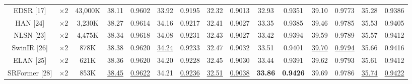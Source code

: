 \documentclass[twocolumn]{svjour3}          %
\begin{document}
\begin{table}
\begin{tabular}{|c|c|c|cc|cc|cc|cc|cc|cc|}

EDSR [17] & $\times 2$&43,000K& \multicolumn{1}{c|}{38.11} & 0.9602 & \multicolumn{1}{c|}{33.92} & 0.9195  &\multicolumn{1}{c|}{32.32} & 0.9013 & \multicolumn{1}{c|}{32.93} & 0.9351  & \multicolumn{1}{c|}{39.10} & 0.9773
&\multicolumn{1}{c|}{35.28} &0.9386\\

HAN [24] & $\times 2$&3,230K& \multicolumn{1}{c|}{38.27} & 0.9614  & \multicolumn{1}{c|}{34.16} & 0.9217  &\multicolumn{1}{c|}{32.41} & 0.9027 & \multicolumn{1}{c|}{33.35} &0.9385& \multicolumn{1}{c|}{39.46} & 0.9785
&\multicolumn{1}{c|}{35.53} &0.9405\\

NLSN [23] & $\times 2$ &4,475K& \multicolumn{1}{c|}{38.34} & 0.9618 & \multicolumn{1}{c|}{34.08} & 0.9231 & \multicolumn{1}{c|}{32.43} & 0.9027 & \multicolumn{1}{c|}{33.42} &0.9394 & \multicolumn{1}{c|}{39.59} & 0.9789
&\multicolumn{1}{c|}{35.57} & 0.9412\\


SwinIR [26] & $\times 2$ &878K& \multicolumn{1}{c|}{38.38} & {0.9620} & \multicolumn{1}{c|}{\color{blue}\underline{34.24}} &{ 0.9233} & \multicolumn{1}{c|}{32.47} & {0.9032} & \multicolumn{1}{c|}{33.51} & {0.9401} & \multicolumn{1}{c|}{\color{blue}\underline{39.70}} &{\color{blue}\underline{0.9794}} &\multicolumn{1}{c|}{35.66} & { 0.9416}\\

ELAN [25] & $\times 2$ &621K& \multicolumn{1}{c|}{38.36} & 0.9620 & \multicolumn{1}{c|}{34.20} & 0.9228 & \multicolumn{1}{c|}{32.45} & 0.9030 & \multicolumn{1}{c|}{33.44} &0.9391 & \multicolumn{1}{c|}{39.62} & 0.9793
&\multicolumn{1}{c|}{35.61} & 0.9412\\

SRFormer [28] & $\times 2$ &853K& \multicolumn{1}{c|}{\color{blue}\underline{38.45}} & {\color{blue}\underline{0.9622}} & \multicolumn{1}{c|}{34.21} &{\color{blue}\underline{ 0.9236}} & \multicolumn{1}{c|}{\color{blue}\underline{32.51}} & {\color{blue}\underline{0.9038}} & \multicolumn{1}{c|}{\color{red}\textbf{33.86}} & {\color{red}\textbf{0.9426}} & \multicolumn{1}{c|}{39.69} &{0.9786} &\multicolumn{1}{c|}{\color{blue}\underline{35.74}} & {\color{blue}\underline{ 0.9422}}\\


\end{tabular}
\end{table}
\end{document}
